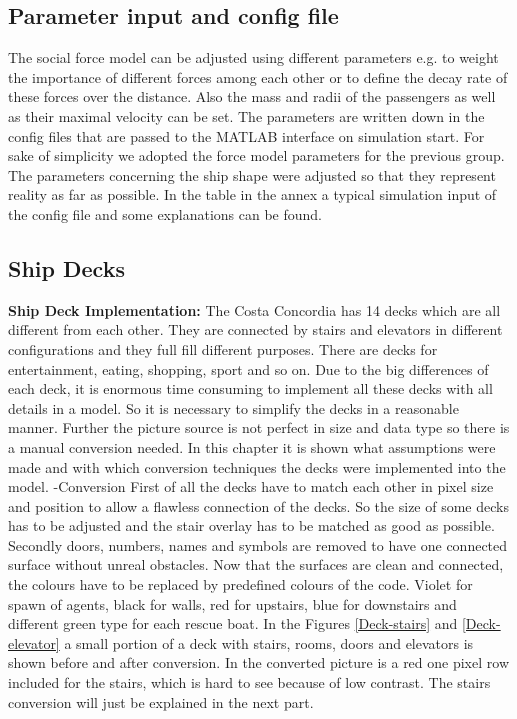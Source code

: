 \documentclass[11pt]{article}
\begin{document}
\subsection{Parameter input and config file}
The social force model can be adjusted using different parameters e.g. to weight the importance of different forces among each other or to define the decay rate of these forces over the distance. Also the mass and radii of the passengers as well as their maximal velocity can be set. The parameters are written down in the config files that are passed to the MATLAB interface on simulation start. For sake of simplicity we adopted the force model parameters for the previous group. The parameters concerning the ship shape were adjusted so that they represent reality as far as possible.
\newline
In the table in the annex a typical simulation input of the config file and some explanations can be found.

\subsection{Ship Decks}

\textbf{Ship Deck Implementation:}
\newline
The Costa Concordia has 14 decks which are all different from each other. They are connected by stairs and elevators in different configurations and they full fill different purposes. There are decks for entertainment, eating, shopping, sport and so on.
Due to the big differences of each deck, it is enormous time consuming to implement all these decks with all details in a model. So it is necessary to simplify the decks in a reasonable manner.
Further the picture source is not perfect in size and data type so there is a manual conversion needed.
In this chapter it is shown what assumptions were made and with which conversion techniques the decks were implemented into the model.
\newline
-Conversion
\newline
First of all the decks have to match each other in pixel size and position to allow a flawless connection of the decks. So the size of some decks has to be adjusted and the stair overlay has to be matched as good as possible.
Secondly doors, numbers, names and symbols are removed to have one connected surface without unreal obstacles.
\newline
Now that the surfaces are clean and connected, the colours have to be replaced by predefined colours of the code. Violet for spawn of agents, black for walls, red for upstairs, blue for downstairs and different green type for each rescue boat.
\newline
In the Figures \ref{Deck-stairs} and \ref{Deck-elevator} a small portion of a deck with stairs, rooms, doors and elevators is shown before and after conversion. In the converted picture is a red one pixel row included for the stairs, which is hard to see because of low contrast. The stairs conversion will just be explained in the next part.
\end{document}
